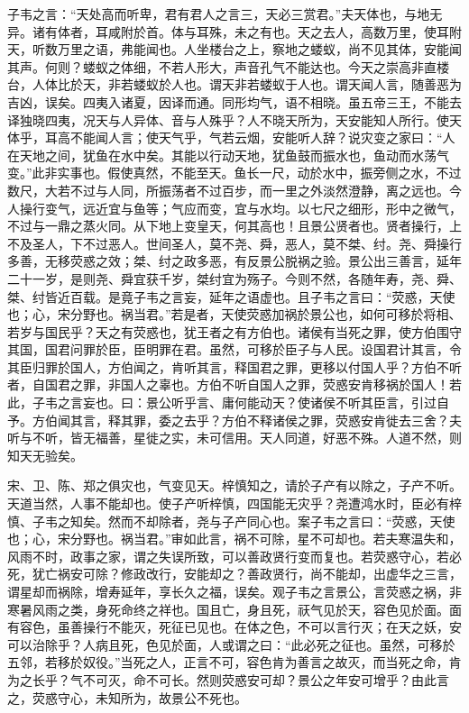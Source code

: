 \documentclass[]{article}
\begin{document}
子韦之言：``天处高而听卑，君有君人之言三，天必三赏君。''夫天体也，与地无异。诸有体者，耳咸附於首。体与耳殊，未之有也。天之去人，高数万里，使耳附天，听数万里之语，弗能闻也。人坐楼台之上，察地之蝼蚁，尚不见其体，安能闻其声。何则？蝼蚁之体细，不若人形大，声音孔气不能达也。今天之崇高非直楼台，人体比於天，非若蝼蚁於人也。谓天非若蝼蚁于人也。谓天闻人言，随善恶为吉凶，误矣。四夷入诸夏，因译而通。同形均气，语不相晓。虽五帝三王，不能去译独晓四夷，况天与人异体、音与人殊乎？人不晓天所为，天安能知人所行。使天体乎，耳高不能闻人言；使天气乎，气若云烟，安能听人辞？说灾变之家曰：``人在天地之间，犹鱼在水中矣。其能以行动天地，犹鱼鼓而振水也，鱼动而水荡气变。''此非实事也。假使真然，不能至天。鱼长一尺，动於水中，振旁侧之水，不过数尺，大若不过与人同，所振荡者不过百步，而一里之外淡然澄静，离之远也。今人操行变气，远近宜与鱼等；气应而变，宜与水均。以七尺之细形，形中之微气，不过与一鼎之蒸火同。从下地上变皇天，何其高也！且景公贤者也。贤者操行，上不及圣人，下不过恶人。世间圣人，莫不尧、舜，恶人，莫不桀、纣。尧、舜操行多善，无移荧惑之效；桀、纣之政多恶，有反景公脱祸之验。景公出三善言，延年二十一岁，是则尧、舜宜获千岁，桀纣宜为殇子。今则不然，各随年寿，尧、舜、桀、纣皆近百载。是竟子韦之言妄，延年之语虚也。且子韦之言曰：``荧惑，天使也；心，宋分野也。祸当君。''若是者，天使荧惑加祸於景公也，如何可移於将相、若岁与国民乎？天之有荧惑也，犹王者之有方伯也。诸侯有当死之罪，使方伯围守其国，国君问罪於臣，臣明罪在君。虽然，可移於臣子与人民。设国君计其言，令其臣归罪於国人，方伯闻之，肯听其言，释国君之罪，更移以付国人乎？方伯不听者，自国君之罪，非国人之辜也。方伯不听自国人之罪，荧惑安肯移祸於国人！若此，子韦之言妄也。曰：景公听乎言、庸何能动天？使诸侯不听其臣言，引过自予。方伯闻其言，释其罪，委之去乎？方伯不释诸侯之罪，荧惑安肯徙去三舍？夫听与不听，皆无福善，星徙之实，未可信用。天人同道，好恶不殊。人道不然，则知天无验矣。

宋、卫、陈、郑之俱灾也，气变见天。梓慎知之，请於子产有以除之，子产不听。天道当然，人事不能却也。使子产听梓慎，四国能无灾乎？尧遭鸿水时，臣必有梓慎、子韦之知矣。然而不却除者，尧与子产同心也。案子韦之言曰：``荧惑，天使也；心，宋分野也。祸当君。''审如此言，祸不可除，星不可却也。若夫寒温失和，风雨不时，政事之家，谓之失误所致，可以善政贤行变而复也。若荧惑守心，若必死，犹亡祸安可除？修政改行，安能却之？善政贤行，尚不能却，出虚华之三言，谓星却而祸除，增寿延年，享长久之福，误矣。观子韦之言景公，言荧惑之祸，非寒暑风雨之类，身死命终之祥也。国且亡，身且死，祆气见於天，容色见於面。面有容色，虽善操行不能灭，死征已见也。在体之色，不可以言行灭；在天之妖，安可以治除乎？人病且死，色见於面，人或谓之曰：``此必死之征也。虽然，可移於五邻，若移於奴役。''当死之人，正言不可，容色肯为善言之故灭，而当死之命，肯为之长乎？气不可灭，命不可长。然则荧惑安可却？景公之年安可增乎？由此言之，荧惑守心，未知所为，故景公不死也。
\end{document}
